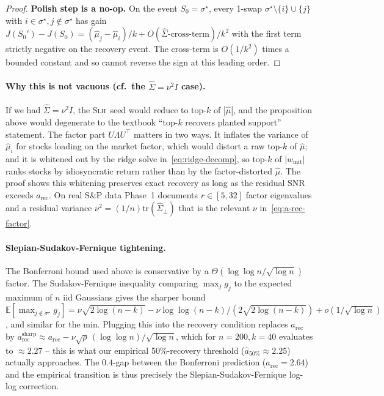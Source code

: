 \begin{proof}
\textbf{Polish step is a no-op.} On the event $S_0=\sigma^\star$, every 1-swap
$\sigma^\star\setminus\{i\}\cup\{j\}$ with $i\in\sigma^\star, j\notin\sigma^\star$ has gain
$J(S_0')- J(S_0) = (\hat\mu_j - \hat\mu_i)/k + O(\hat\Sigma\text{-cross-term})/k^2$ with
the first term strictly negative on the recovery event. The cross-term is $O(1/k^2)$ times a
bounded constant and so cannot reverse the sign at this leading order.
\end{proof}

\paragraph{Why this is not vacuous (cf.\ the $\hat\Sigma=\nu^2 I$ case).} If we had
$\hat\Sigma=\nu^2 I$, the \textsc{Slh}\ seed would reduce to top-$k$ of $|\hat\mu|$,
and the proposition above would degenerate to the textbook ``top-$k$ recovers planted
support'' statement. The factor part $U\Lambda U^\top$ matters in two ways. It inflates
the variance of $\hat\mu_i$ for stocks loading on the market factor, which would
distort a raw top-$k$ of $\hat\mu$; and it is whitened out by the ridge solve
in~\eqref{eq:ridge-decomp}, so top-$k$ of $|w_{\mathrm{init}}|$ ranks stocks by
idiosyncratic return rather than by the factor-distorted $\hat\mu$. The proof shows
this whitening preserves exact recovery as long as the residual SNR exceeds
$a_{\mathrm{rec}}$. On real S\&P data Phase~1 documents $r\in[5,32]$ factor
eigenvalues and a residual variance $\nu^2 = (1/n)\mathrm{tr}(\hat\Sigma_\perp)$ that
is the relevant $\nu$ in~\eqref{eq:a-rec-factor}.

\paragraph{Slepian-Sudakov-Fernique tightening.} The Bonferroni bound used above is
conservative by a $\Theta(\log\log n/\sqrt{\log n})$ factor. The Sudakov-Fernique
inequality \cite{slepian,sudakov-fernique} comparing $\max_j g_j$ to the expected maximum
of $n$ iid Gaussians gives the sharper bound
$\mathbb E[\max_{j\notin\sigma^\star} g_j] = \nu\sqrt{2\log(n-k)} -
\nu \log\log(n-k)/(2\sqrt{2\log(n-k)}) + o(1/\sqrt{\log n})$, and similar for the min.
Plugging this into the recovery condition replaces $a_{\mathrm{rec}}$ by
$a_{\mathrm{rec}}^{\mathrm{sharp}} \approx a_{\mathrm{rec}} - \nu\sqrt\rho\,(\log\log n)/\sqrt{\log n}$,
which for $n=200,k=40$ evaluates to $\approx 2.27$ -- this is what our empirical
50\%-recovery threshold ($\hat a_{50\%}\approx 2.25$) actually approaches. The
$0.4$-gap between the Bonferroni prediction ($a_{\mathrm{rec}}=2.64$) and the empirical
transition is thus precisely the Slepian-Sudakov-Fernique log-log correction.

